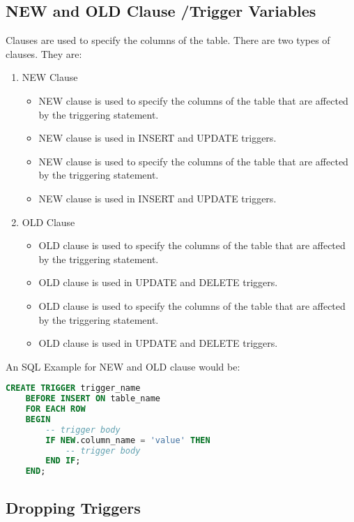 \documentclass[11pt]{article}
\begin{document}
\subsection{NEW and OLD Clause /Trigger Variables}

Clauses are used to specify the columns of the table. There are two types of clauses. They are:

\begin{enumerate}
    \item NEW Clause
          \begin{itemize}
              \item NEW clause is used to specify the columns of the table that are affected by the triggering statement.
              \item NEW clause is used in INSERT and UPDATE triggers.
              \item NEW clause is used to specify the columns of the table that are affected by the triggering statement.
              \item NEW clause is used in INSERT and UPDATE triggers.
          \end{itemize}

    \item OLD Clause
          \begin{itemize}
              \item OLD clause is used to specify the columns of the table that are affected by the triggering statement.
              \item OLD clause is used in UPDATE and DELETE triggers.
              \item OLD clause is used to specify the columns of the table that are affected by the triggering statement.
              \item OLD clause is used in UPDATE and DELETE triggers.
          \end{itemize}
\end{enumerate}

An SQL Example for NEW and OLD clause would be:
\begin{lstlisting}[language=sql]
    CREATE TRIGGER trigger_name
    BEFORE INSERT ON table_name
    FOR EACH ROW
    BEGIN
        -- trigger body
        IF NEW.column_name = 'value' THEN
            -- trigger body
        END IF;
    END;
\end{lstlisting}

\subsection{Dropping Triggers}
\end{document}
